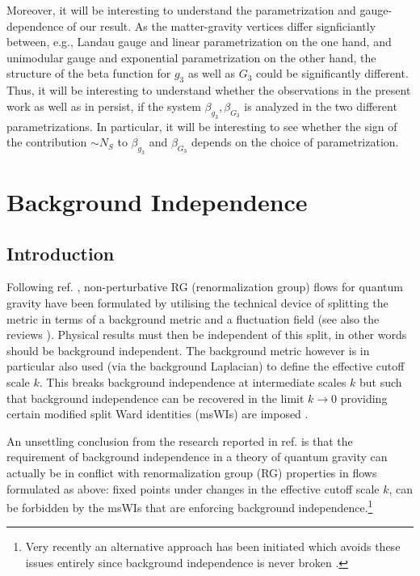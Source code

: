 \documentclass[11pt]{book} %
\begin{document}
 Moreover, it will be interesting to understand the parametrization and gauge-dependence of our result. As the matter-gravity vertices differ signficiantly between, e.g., Landau gauge and linear parametrization on the one hand, and unimodular gauge and exponential parametrization on the other hand, the structure of the beta function for $g_3$ as well as $G_3$ could be significantly different. Thus, it will be interesting to understand whether the observations in the present work as well as in \cite{Meibohm:2015twa} persist, if the system $\beta_{g_3}, \beta_{G_3}$ is analyzed in the two different parametrizations. In particular, it will be interesting to see whether the sign of the contribution $\sim N_S$ to $\beta_{g_3}$ and $\beta_{G_3}$ depends on the choice of parametrization.



\chapter{Background Independence}


\section{Introduction}\label{sec:introduction}

Following ref. \cite{Reuter:1996}, non-perturbative RG (renormalization group) flows for quantum gravity have been formulated by utilising the technical device of splitting the metric in terms of a background metric and a fluctuation field (see also the reviews \cite{Reuter:2012,Percacci:2011fr,Niedermaier:2006wt,Nagy:2012ef,Litim:2011cp}). Physical results must then be independent of this split, in other words should be background independent. The background metric however is in particular also used (via the background Laplacian) to define the effective cutoff scale $k$. This breaks background independence at intermediate scales $k$ but such that background independence can be recovered in the limit $k\to0$ providing certain modified split Ward identities (msWIs) are imposed \cite{Pawlowski:2005xe,Litim:2002hj,Bridle:2013sra,Reuter:1997gx,Litim:1998nf,Litim:2002ce,Manrique:2009uh,Manrique:2010mq,Manrique:2010am,Dietz:2015owa,Safari:2015dva}.



An unsettling conclusion from the research reported in ref. \cite{Dietz:2015owa} is that the requirement of background independence in a theory of quantum gravity can actually be in conflict with renormalization group (RG) properties in flows formulated as above: fixed points under changes in the effective cutoff scale $k$, can be forbidden by the msWIs  that are enforcing background independence.\footnote{Very recently an alternative approach has been initiated which avoids these issues entirely since background independence is never broken \cite{Morris:2016nda}.} 
\end{document}
